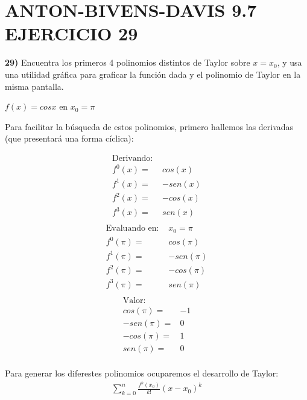 \chapter*{ANTON-BIVENS-DAVIS 9.7 EJERCICIO 29}

\textbf{29)} Encuentra los primeros 4 polinomios distintos de Taylor sobre $x = x_{0}$, y usa una utilidad gráfica para graficar la función dada y el polinomio de Taylor en la misma pantalla. \\
\begin{center}
   $f(x) = cos x$ en $  x_{0}= \pi$
\end{center}
Para facilitar la búsqueda de estos polinomios, primero hallemos las derivadas (que presentará una forma cíclica):
\begin{multicols}{3}
	\noindent
	\begin{align*}
		\text{Derivando: } &        \\
		f^{0}(x) =& cos(x) \\
        f^{1}(x) =& -sen(x) \\
        f^{2}(x) =& -cos(x) \\
        f^{3}(x) =& sen(x) \\
	\end{align*}
	\columnbreak
	\begin{align*}
		\text{Evaluando en: }& x_{0} = \pi     \\
		f^{0}(\pi) =& cos(\pi) \\
        f^{1}(\pi) =& -sen(\pi) \\
        f^{2}(\pi) =& -cos(\pi) \\
        f^{3}(\pi) =& sen(\pi) \\
	\end{align*}
	\columnbreak
	\begin{align*}
		\text{Valor: }&      \\
        cos(\pi) =& -1\\
        -sen(\pi) =&  0\\
        -cos(\pi) =&  1\\
        sen(\pi) =&   0\\
	\end{align*}
\end{multicols}
Para generar los diferestes polinomios ocuparemos el desarrollo de Taylor:
\begin{align*}
   \sum_{k=0}^{n} \frac{f^{k}(x_{0})}{k!}(x-x_{0})^{k}
\end{align*}

